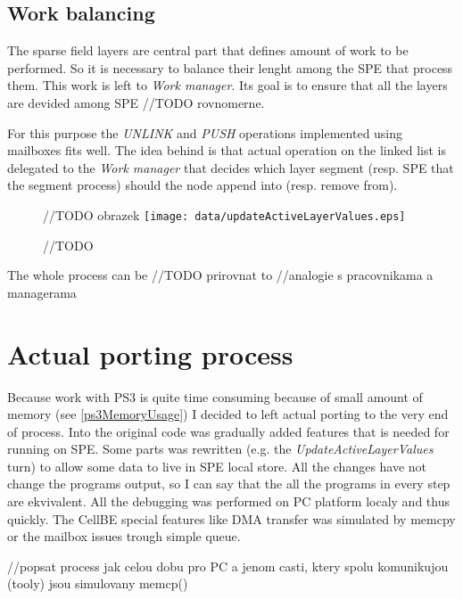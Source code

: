 \subsection{Work balancing}

The sparse field layers are central part that defines amount of work to be
performed. So it is necessary to balance their lenght among the SPE that
process them. This work is left to \emph{Work manager}. Its goal is to ensure
that all the layers are devided among SPE //TODO rovnomerne.

For this purpose the \emph{UNLINK} and \emph{PUSH} operations implemented using
mailboxes fits well. The idea behind is that actual operation on the linked
list is delegated to the \emph{Work manager} that decides which layer segment
(resp. SPE that the segment process) should the node append into (resp. remove
from).

\begin{figure}	//TODO obrazek
    \centering
    \texttt{[image: data/updateActiveLayerValues.eps]}
    \caption[Diagram of new design components]{//TODO}
    \label{fg:updateActiveLayerValues}
\end{figure}

The whole process can be //TODO prirovnat to
//analogie s pracovnikama a managerama

\section{Actual porting process}

Because work with PS3 is quite time consuming because of small amount of memory
(see \ref{ps3MemoryUsage}) I decided to left actual porting to the very end of
process. Into the original code was gradually added features that is needed for
running on SPE. Some parts was rewritten (e.g. the
\emph{UpdateActiveLayerValues} turn) to allow some data to live in SPE local
store. All the changes have not change the programs output, so I can say that
the all the programs in every step are ekvivalent. All the debugging was
performed on PC platform localy and thus quickly. The CellBE special features
like DMA transfer was simulated by memcpy or the mailbox issues trough simple
queue.



//popsat process jak celou dobu pro PC a jenom casti, ktery spolu komunikujou (tooly) jsou simulovany memcp()